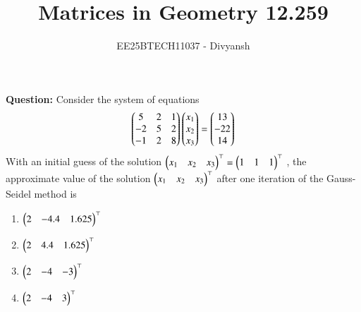 \documentclass[journal,12pt,onecolumn]{IEEEtran}
\title{Matrices in Geometry 12.259}
\author{EE25BTECH11037 - Divyansh}
\theoremstyle{remark}
\begin{document}
\vspace{3cm}
\maketitle
{\let\newpage\relax\maketitle}
\textbf{Question: }
Consider the system of equations
\begin{align*}
    \begin{pmatrix}5 & 2 & 1 \\ -2 & 5 & 2 \\ -1 & 2 & 8\end{pmatrix}\begin{pmatrix}x_1 \\ x_2\\ x_3\end{pmatrix}=\begin{pmatrix}13 \\ -22 \\ 14\end{pmatrix}
\end{align*}
With an initial guess of the solution $\begin{pmatrix}x_1 & x_2& x_3\end{pmatrix}^{\top} = \begin{pmatrix}1 & 1& 1\end{pmatrix}^{\top}$ , the approximate value of the solution $\begin{pmatrix}x_1 & x_2& x_3\end{pmatrix}^{\top}$ after one iteration of the Gauss-Seidel method is
\begin{enumerate}
    \item $\begin{pmatrix}2 & -4.4& 1.625\end{pmatrix}^{\top}$
    \item $\begin{pmatrix}2 & 4.4& 1.625\end{pmatrix}^{\top}$
    \item $\begin{pmatrix}2 & -4& -3\end{pmatrix}^{\top}$
    \item $\begin{pmatrix}2 & -4& 3\end{pmatrix}^{\top}$
\end{enumerate}
    

\vspace{2mm}
\end{document}

